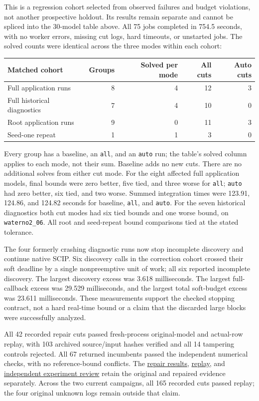 This is a regression cohort selected from observed failures and budget
violations, not another prospective holdout. Its results remain separate
and cannot be spliced into the 30-model table above. All 75 jobs completed
in 754.5 seconds, with no worker errors, missing cut logs, hard timeouts,
or unstarted jobs. The solved counts were identical across the three
modes within each cohort:

\begin{center}
\begin{tabular}{lrrrr}
\toprule
Matched cohort & Groups & Solved per mode & All cuts & Auto cuts\\
\midrule
Full application runs & 8 & 4 & 12 & 3\\
Full historical diagnostics & 7 & 4 & 10 & 0\\
Root application runs & 9 & 0 & 11 & 3\\
Seed-one repeat & 1 & 1 & 3 & 0\\
\bottomrule
\end{tabular}
\end{center}
Every group has a baseline, an \texttt{all}, and an \texttt{auto} run;
the table's solved column applies to each mode, not their sum. Baseline
adds no new cuts. There are no additional solves from either cut mode.
For the eight affected full application models, final bounds were zero
better, five tied, and three worse for \texttt{all}; \texttt{auto}
had zero better, six tied, and two worse. Summed integration times were
123.91, 124.86, and 124.82 seconds for baseline, \texttt{all}, and
\texttt{auto}. For the seven historical diagnostics both cut modes had
six tied bounds and one worse bound, on \texttt{waterno2\_06}.
All root and seed-repeat bound comparisons tied at the stated tolerance.

The four formerly crashing diagnostic runs now stop incomplete discovery
and continue native SCIP. Six discovery calls in the correction cohort
crossed their soft deadline by a single nonpreemptive unit of work;
all six reported incomplete discovery. The largest discovery excess
was 3.618 milliseconds. The largest full-callback excess was 29.529
milliseconds, and the largest total soft-budget excess was 23.611
milliseconds. These measurements support the checked stopping contract,
not a hard real-time bound or a claim that the discarded large blocks
were successfully analyzed.

All 42 recorded repair cuts passed fresh-process original-model and actual-row
replay, with 103 archived source/input hashes verified and all 14 tampering
controls rejected. All 67 returned incumbents passed the independent numerical
checks, with no reference-bound conflicts. The
\href{run:../experiments/repair-discovery-v1/results.md}{repair results},
\href{run:../experiments/repair-discovery-v1/replay.json}{replay}, and
\href{run:../reviews/experiment-review.md}{independent experiment review}
retain the original and repaired evidence separately. Across the two
current campaigns, all 165 recorded cuts passed replay; the four original
unknown logs remain outside that claim.

